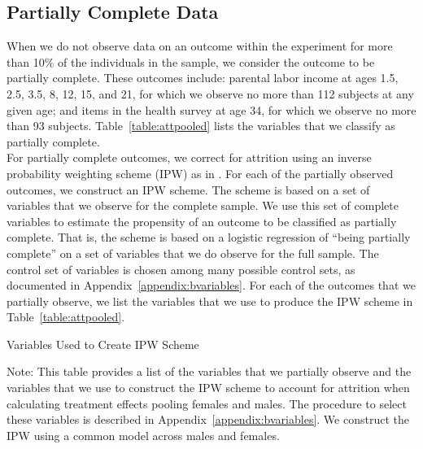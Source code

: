 \subsection{Partially Complete Data}
\label{app:method_partialobs}

When we do not observe data on an outcome within the experiment for more than 10\% of the individuals in the sample, we consider the outcome to be partially complete. These outcomes include: parental labor income at ages 1.5, 2.5, 3.5, 8, 12, 15, and 21, for which we observe no more than 112 subjects at any given age; and items in the health survey at age 34, for which we observe no more than 93 subjects. Table~\ref{table:attpooled} lists the variables that we classify as partially complete.\\

\noindent For partially complete outcomes, we correct for attrition using an inverse probability weighting scheme (IPW) as in  \citet{Horvitz_Thompson_1952_JASA}. For each of the partially observed outcomes, we construct an IPW scheme. The scheme is based on a set of variables that we observe for the complete sample. We use this set of complete variables to estimate the propensity of an outcome to be classified as partially complete. That is, the scheme is based on a logistic regression of ``being partially complete'' on a set of variables that we do observe for the full sample. The control set of variables is chosen among many possible control sets,  as documented in Appendix~\ref{appendix:bvariables}. For each of the outcomes that we partially observe, we list the variables that we use to produce the IPW scheme in Table~\ref{table:attpooled}.

\begin{table}
\begin{threeparttable}
\caption{Variables Used to Create IPW Scheme}
\label{table:attpooled}
\centering

\begin{tablenotes}
\footnotesize
\item Note: This table provides a list of the variables that we partially observe and the variables that we use to construct the IPW scheme to account for attrition when calculating treatment effects pooling females and males. The procedure to select these variables is described in Appendix~\ref{appendix:bvariables}. We construct the IPW using a common model across males and females.
\end{tablenotes}
\end{threeparttable}
\end{table}
\restoregeometry
\doublespacing

